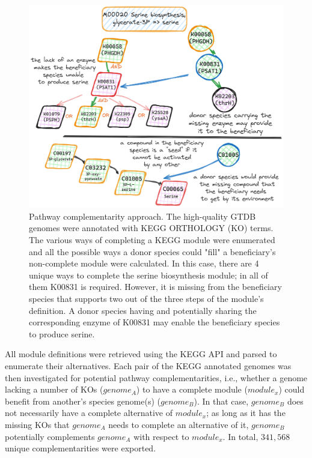 \documentclass[sn-mathphys,Numbered]{sn-jnl}  %
\theoremstyle{thmstyleone}%
\theoremstyle{thmstyletwo}%
\theoremstyle{thmstylethree}%
\begin{document}
        \begin{figure}[h!]
            \includegraphics*[width=0.8\columnwidth]{figs/path_complem.png}
            \caption{
                Pathway complementarity approach. 
                The high-quality GTDB genomes were annotated with KEGG ORTHOLOGY (KO) terms.
                The various ways of completing a KEGG module were enumerated and all the possible ways a donor species could "fill" a beneficiary's non-complete module were calculated.
                In this case, there are 4 unique ways to complete the serine biosynthesis module; in all of them K00831 is required.
                However, it is missing from the beneficiary species that supports two out of the three steps of the module's definition.
                A donor species having and potentially sharing the corresponding enzyme of K00831 may enable the beneficiary species to produce serine.
            }
            \label{fig:pathcompl}
        \end{figure}

        All module definitions were retrieved using the KEGG API and parsed to enumerate their alternatives.
        Each pair of the KEGG annotated genomes was then investigated for potential pathway complementarities, 
        i.e., whether a genome lacking a number of KOs ($genome_A$) to have a complete module ($module_x$) could benefit from another's species genome(s) ($genome_B$).
        In that case, $genome_B$ does not necessarily have a complete alternative of $module_x$; as long as it has the missing KOs that $genome_A$ needs to complete an alternative of it, $genome_B$ potentially complements $genome_A$ with respect to $module_x$.
        In total, $341,568$ unique complementarities were exported.
\end{document}
